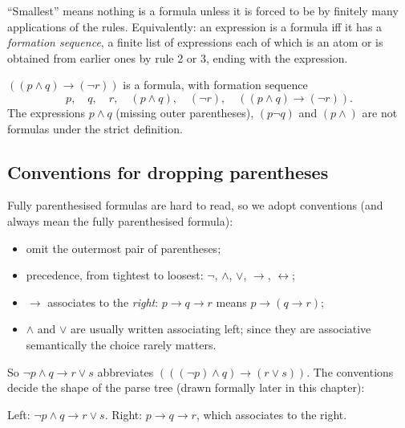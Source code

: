 ``Smallest'' means nothing is a formula unless it is forced to be by finitely many
applications of the rules. Equivalently: an expression is a formula iff it has a
\emph{formation sequence}, a finite list of expressions each of which is an atom or is
obtained from earlier ones by rule 2 or 3, ending with the expression.

\begin{example}
$((p \land q) \to (\neg r))$ is a formula, with formation sequence
\[
  p,\quad q,\quad r,\quad (p\land q),\quad (\neg r),\quad ((p\land q)\to(\neg r)).
\]
The expressions $p\land q$ (missing outer parentheses), $(p \neg q)$ and $(p \land)$ are
not formulas under the strict definition.
\end{example}

\subsection{Conventions for dropping parentheses}

Fully parenthesised formulas are hard to read, so we adopt conventions (and always
mean the fully parenthesised formula):
\begin{itemize}
  \item omit the outermost pair of parentheses;
  \item precedence, from tightest to loosest: $\neg$, $\land$, $\lor$, $\to$,
        $\leftrightarrow$;
  \item $\to$ associates to the \emph{right}: $p \to q \to r$ means $p\to(q\to r)$;
  \item $\land$ and $\lor$ are usually written associating left; since they are
        associative semantically the choice rarely matters.
\end{itemize}
So $\neg p \land q \to r \lor s$ abbreviates $(((\neg p) \land q) \to (r \lor s))$.
The conventions decide the shape of the parse tree (drawn formally later in this chapter):
\begin{center}
\hspace{2cm}

\small Left: $\neg p\land q\to r\lor s$. Right: $p\to q\to r$, which associates to the right.
\end{center}

